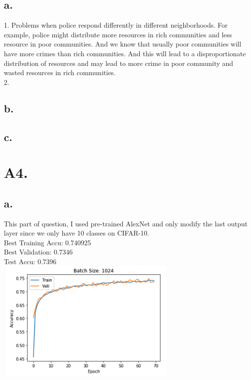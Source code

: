 \documentclass{article}
\begin{document}
\subsection*{a.}
1. Problems when police respond differently in different neighborhoods.
For example, police might distribute more resources in rich communities and less resource in poor communities. And we know that usually poor communities will have more crimes than rich communities. And this will lead to a disproportionate distribution of resources and may lead to more crime in poor community and wasted resources in rich communities. \\

2. 

\subsection*{b.}





\subsection*{c.}



\section*{A4. }

\subsection*{a.}
This part of question, I used pre-trained AlexNet and only modify the last output layer since we only have 10 classes on CIFAR-10. \\
Best Training Accu:  0.740925 \\
Best Validation: 0.7346 \\
Test Accu:  0.7396 \\

\includegraphics[width=9cm, height=6cm]{plots/A4a.png}
\end{document}
